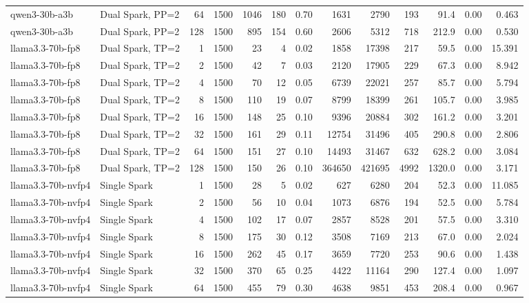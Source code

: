 \begin{tabular}{l l r r r r r r r r r r r}
qwen3-30b-a3b & Dual Spark, PP=2 & 64 & 1500 & 1046 & 180 & 0.70 & 1631 & 2790 & 193 & 91.4 & 0.00 & 0.463 \\
qwen3-30b-a3b & Dual Spark, PP=2 & 128 & 1500 & 895 & 154 & 0.60 & 2606 & 5312 & 718 & 212.9 & 0.00 & 0.530 \\
\addlinespace
llama3.3-70b-fp8 & Dual Spark, TP=2 & 1 & 1500 & 23\rlap{$^\dagger$} & 4 & 0.02 & 1858 & 17398 & 217 & 59.5 & 0.00 & 15.391 \\
llama3.3-70b-fp8 & Dual Spark, TP=2 & 2 & 1500 & 42\rlap{$^\dagger$} & 7 & 0.03 & 2120 & 17905 & 229 & 67.3 & 0.00 & 8.942 \\
llama3.3-70b-fp8 & Dual Spark, TP=2 & 4 & 1500 & 70\rlap{$^\dagger$} & 12 & 0.05 & 6739 & 22021 & 257 & 85.7 & 0.00 & 5.794 \\
llama3.3-70b-fp8 & Dual Spark, TP=2 & 8 & 1500 & 110 & 19 & 0.07 & 8799 & 18399 & 261 & 105.7 & 0.00 & 3.985 \\
llama3.3-70b-fp8 & Dual Spark, TP=2 & 16 & 1500 & 148 & 25 & 0.10 & 9396 & 20884 & 302 & 161.2 & 0.00 & 3.201 \\
llama3.3-70b-fp8 & Dual Spark, TP=2 & 32 & 1500 & 161 & 29 & 0.11 & 12754 & 31496 & 405 & 290.8 & 0.00 & 2.806 \\
llama3.3-70b-fp8 & Dual Spark, TP=2 & 64 & 1500 & 151 & 27 & 0.10 & 14493 & 31467 & 632 & 628.2 & 0.00 & 3.084 \\
llama3.3-70b-fp8 & Dual Spark, TP=2 & 128 & 1500 & 150 & 26 & 0.10 & 364650 & 421695 & 4992 & 1320.0 & 0.00 & 3.171 \\
\addlinespace
llama3.3-70b-nvfp4 & Single Spark & 1 & 1500 & 28\rlap{$^\dagger$} & 5 & 0.02 & 627 & 6280 & 204 & 52.3 & 0.00 & 11.085 \\
llama3.3-70b-nvfp4 & Single Spark & 2 & 1500 & 56\rlap{$^\dagger$} & 10 & 0.04 & 1073 & 6876 & 194 & 52.5 & 0.00 & 5.784 \\
llama3.3-70b-nvfp4 & Single Spark & 4 & 1500 & 102 & 17 & 0.07 & 2857 & 8528 & 201 & 57.5 & 0.00 & 3.310 \\
llama3.3-70b-nvfp4 & Single Spark & 8 & 1500 & 175 & 30 & 0.12 & 3508 & 7169 & 213 & 67.0 & 0.00 & 2.024 \\
llama3.3-70b-nvfp4 & Single Spark & 16 & 1500 & 262 & 45 & 0.17 & 3659 & 7720 & 253 & 90.6 & 0.00 & 1.438 \\
llama3.3-70b-nvfp4 & Single Spark & 32 & 1500 & 370 & 65 & 0.25 & 4422 & 11164 & 290 & 127.4 & 0.00 & 1.097 \\
llama3.3-70b-nvfp4 & Single Spark & 64 & 1500 & 455 & 79 & 0.30 & 4638 & 9851 & 453 & 208.4 & 0.00 & 0.967 \\

\end{tabular}
